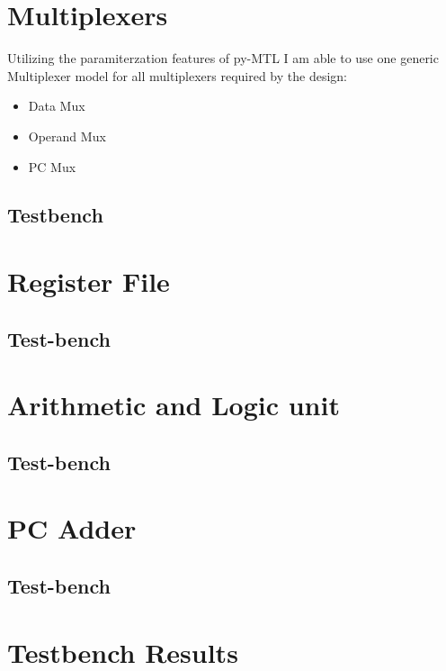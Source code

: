 \documentclass{article}
\begin{document}
\section{Multiplexers}
Utilizing the paramiterzation features of py-MTL I am able to use one generic Multiplexer model for all multiplexers required by the design:
\begin{itemize}
    \item Data Mux
    \item Operand Mux
    \item PC Mux
\end{itemize}

\clearpage
\subsection{Testbench}


\section{Register File}

\subsection{Test-bench}


\section{Arithmetic and Logic unit}

\subsection{Test-bench}


\section{PC Adder}

\subsection{Test-bench}


\section{Testbench Results}
\end{document}
